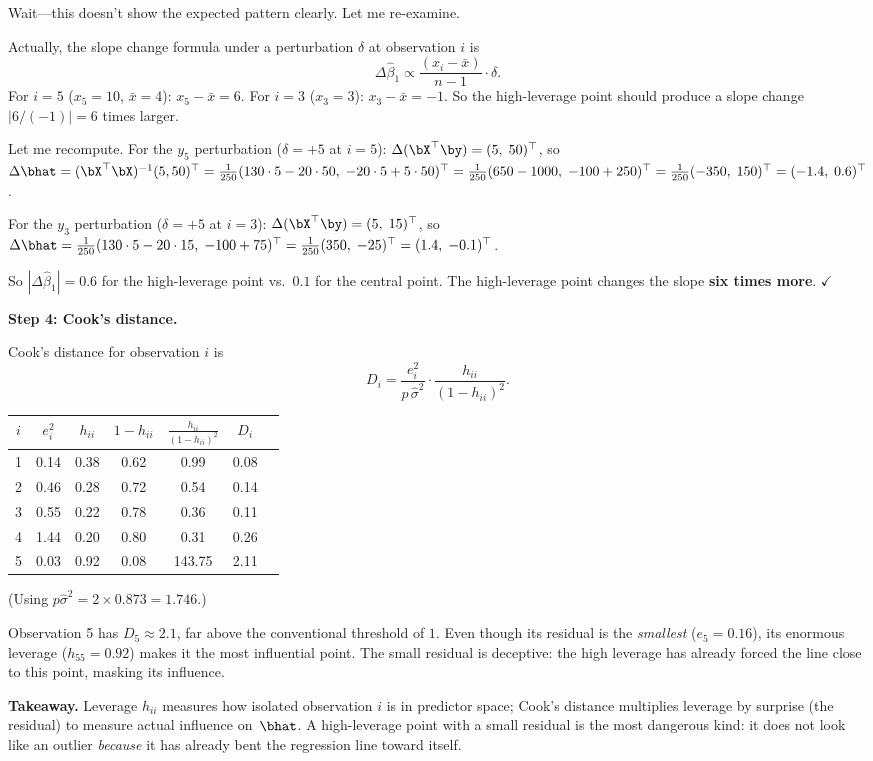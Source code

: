 \begin{example}
Wait---this doesn't show the expected pattern clearly. Let me re-examine.

Actually, the slope change formula under a perturbation $\delta$ at observation $i$ is
\[
\Delta\hat\beta_1 \propto \frac{(x_i - \bar{x})}{n-1}\cdot\delta.
\]
For $i=5$ ($x_5=10$, $\bar{x}=4$): $x_5-\bar{x}=6$. For $i=3$ ($x_3=3$): $x_3-\bar{x}=-1$.
So the high-leverage point should produce a slope change $|6/(-1)| = 6$ times larger.

Let me recompute. For the $y_5$ perturbation ($\delta=+5$ at $i=5$):
$\Delta(\bX^\top\by) = (5,\;50)^\top$, so
$\Delta\bhat = (\bX^\top\bX)^{-1}(5,50)^\top = \frac{1}{250}(130\cdot5-20\cdot50,\;-20\cdot5+5\cdot50)^\top
= \frac{1}{250}(650-1000,\;-100+250)^\top = \frac{1}{250}(-350,\;150)^\top = (-1.4,\;0.6)^\top$.

For the $y_3$ perturbation ($\delta=+5$ at $i=3$):
$\Delta(\bX^\top\by) = (5,\;15)^\top$, so
$\Delta\bhat = \frac{1}{250}(130\cdot5-20\cdot15,\;-100+75)^\top
= \frac{1}{250}(350,\;-25)^\top = (1.4,\;-0.1)^\top$.

So $|\Delta\hat\beta_1| = 0.6$ for the high-leverage point vs.\ $0.1$ for the central point.
The high-leverage point changes the slope \textbf{six times more}. $\checkmark$

\medskip\noindent\textbf{Step 4: Cook's distance.}

Cook's distance for observation $i$ is
\[
D_i = \frac{e_i^2}{p\,\hat\sigma^2}\cdot\frac{h_{ii}}{(1-h_{ii})^2}.
\]
\begin{center}
\renewcommand{\arraystretch}{1.2}
\begin{tabular}{c|cccccc}
\toprule
$i$ & $e_i^2$ & $h_{ii}$ & $1-h_{ii}$ & $\frac{h_{ii}}{(1-h_{ii})^2}$ & $D_i$ \\
\midrule
1 & 0.14 & 0.38 & 0.62 & 0.99 & 0.08 \\
2 & 0.46 & 0.28 & 0.72 & 0.54 & 0.14 \\
3 & 0.55 & 0.22 & 0.78 & 0.36 & 0.11 \\
4 & 1.44 & 0.20 & 0.80 & 0.31 & 0.26 \\
5 & 0.03 & 0.92 & 0.08 & 143.75 & 2.11 \\
\bottomrule
\end{tabular}
\end{center}
(Using $p\hat\sigma^2 = 2\times 0.873 = 1.746$.)

Observation 5 has $D_5 \approx 2.1$, far above the conventional threshold of $1$.
Even though its residual is the \emph{smallest} ($e_5 = 0.16$), its enormous leverage
($h_{55} = 0.92$) makes it the most influential point.
The small residual is deceptive: the high leverage has already forced the line
close to this point, masking its influence.

\medskip\noindent\textbf{Takeaway.}
Leverage $h_{ii}$ measures how isolated observation $i$ is in predictor space;
Cook's distance multiplies leverage by surprise (the residual) to measure
actual influence on~$\bhat$.
A high-leverage point with a small residual is the most dangerous kind:
it does not look like an outlier \emph{because} it has already
bent the regression line toward itself.
\end{example}


